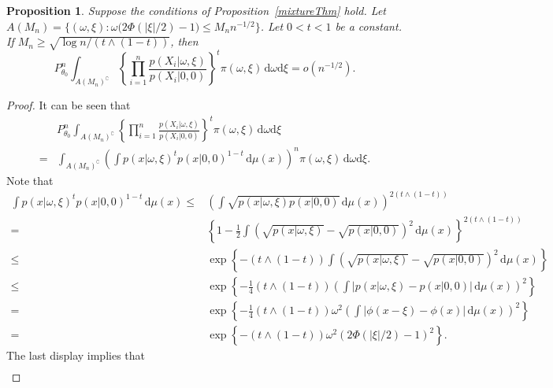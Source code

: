 \documentclass[11pt]{article}
\theoremstyle{plain}
\newtheorem{proposition}{\quad\quad Proposition}
\theoremstyle{definition}
\theoremstyle{remark}
\begin{document}
\begin{appendices}
\begin{proposition}\label{lastProp}
    Suppose the conditions of Proposition~\ref{mixtureThm} hold.
    Let $A(M_n)=\{(\omega, \xi): \omega \big( 2\Phi(|\xi|/2)-1\big)\leq M_n n^{-1/2}\}$.
    Let $0<t<1$ be a constant.
    If $M_n \geq \sqrt{{\log n}/(t\wedge (1-t))}$, then
    \begin{equation*}
        P^n_{\theta_0} \int_{A(M_n)^\complement} \left\{\prod_{i=1}^n \frac{p(X_i|\omega,\xi)}{p(X_i|0,0)}\right\}^t \pi(\omega,\xi)\, \mathrm  d\omega \mathrm d \xi =o(n^{-1/2}).
    \end{equation*}
\end{proposition}
\begin{proof}
    It can be seen that
\begin{equation*}
    \begin{split}
        &P^n_{\theta_0} \int_{A(M_n)^\complement} \left\{\prod_{i=1}^n \frac{p(X_i|\omega,\xi)}{p(X_i|0,0)}\right\}^t \pi(\omega,\xi)\, \mathrm d\omega \mathrm d\xi
    \\
    =&
    \int_{A(M_n)^\complement} \left( \int p( x |\omega,\xi)^t p( x |0,0)^{1-t}\, \mathrm d \mu (x) \right)^n \pi(\omega,\xi)\, \mathrm d\omega \mathrm d\xi.
    \end{split}
\end{equation*}
Note that
\begin{align*}
    \int p( x |\omega,\xi)^t p( x |0,0)^{1-t}\, \mathrm d \mu(x)
    \leq&  \left(\int \sqrt{p( x |\omega,\xi) p( x |0,0)}\, \mathrm d\mu (x) \right)^{2(t\wedge (1-t))}
    \\
    = & \left\{1-\frac{1}{2}\int \left(\sqrt{p( x |\omega,\xi) }-\sqrt{p( x |0,0)}\right)^2\, \mathrm d\mu (x) \right\}^{2(t\wedge (1-t))}
\\
\leq & \exp \left\{ -(t\wedge (1-t))\int \left(\sqrt{p( x |\omega,\xi) }-\sqrt{p( x |0,0)}\right)^2\, \mathrm  d \mu (x) \right\}
\\
\leq & \exp \left\{ -\frac{1}{4}(t\wedge (1-t)) \left(\int \left| p( x |\omega,\xi)-p( x |0,0)\right|\, \mathrm d\mu (x) \right)^2 \right\}
\\
= & \exp \left\{ -\frac{1}{4}(t\wedge (1-t)) \omega^2 \left(\int \left| \phi(x -\xi)-\phi (x)\right|\, \mathrm d \mu (x) \right)^2 \right\}
\\
= & \exp \left\{ -(t\wedge (1-t)) \omega^2 \left( 2\Phi(|\xi|/2)-1\right)^2 \right\}.
\end{align*}
The last display implies that
\begin{align*}

\end{align*}
\end{proof}
\end{appendices}
\end{document}
